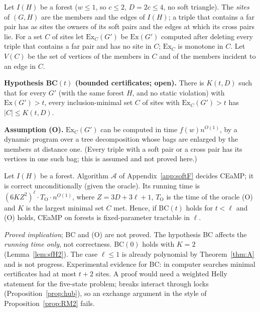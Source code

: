 Let $I(H)$ be a forest ($w\le1$, so $c\le2$, $D=2c\le4$, no soft triangle). The \emph{sites} of $(G,H)$ are the members and the edges of $I(H)$; a triple that contains a far pair has as sites the owners of its soft pairs and the edges at which its cross pairs lie. For a set $C$ of sites let $\mathrm{Ex}_C(G')$ be $\mathrm{Ex}(G')$ computed after deleting every triple that contains a far pair and has no site in $C$; $\mathrm{Ex}_C$ is monotone in $C$. Let $V(C)$ be the set of vertices of the members in $C$ and of the members incident to an edge in $C$.

\textbf{Hypothesis BC$(t)$ (bounded certificates; open).} There is $K(t,D)$ such that for every $G'$ (with the same forest $H$, and no static violation) with $\mathrm{Ex}(G')>t$, every inclusion-minimal set $C$ of sites with $\mathrm{Ex}_C(G')>t$ has $|C|\le K(t,D)$.

\textbf{Assumption (O).} $\mathrm{Ex}_C(G')$ can be computed in time $f(w)n^{O(1)}$, by a dynamic program over a tree decomposition whose bags are enlarged by the members at distance one. (Every triple with a soft pair or a cross pair has its vertices in one such bag; this is assumed and not proved here.)
\begin{theorem}\label{thm:F}
Let $I(H)$ be a forest. Algorithm $\mathcal A$ of Appendix~\ref{app:softF} decides CEaMP; it is correct unconditionally (given the oracle). Its running time is $(6KZ^{2})^{\ell}\cdot T_{\mathrm{O}}\cdot n^{O(1)}$, where $Z=3D+3\ell+1$, $T_{\mathrm{O}}$ is the time of the oracle (O) and $K$ is the largest minimal set $C$ met. Hence, if BC$(t)$ holds for $t<\ell$ and (O) holds, CEaMP on forests is fixed-parameter tractable in $\ell$.
\end{theorem}
\emph{Proved implication}; BC and (O) are not proved. The hypothesis BC affects the \emph{running time only}, not correctness. BC$(0)$ holds with $K=2$ (Lemma~\ref{lem:sfH2}). The case $\ell\le1$ is already polynomial by Theorem~\ref{thm:A} and is not progress. Experimental evidence for BC: in computer searches minimal certificates had at most $t+2$ sites. A proof would need a weighted Helly statement for the five-state problem; breaks interact through locks (Proposition~\ref{prop:hub}), so an exchange argument in the style of Proposition~\ref{prop:RM2} fails.

